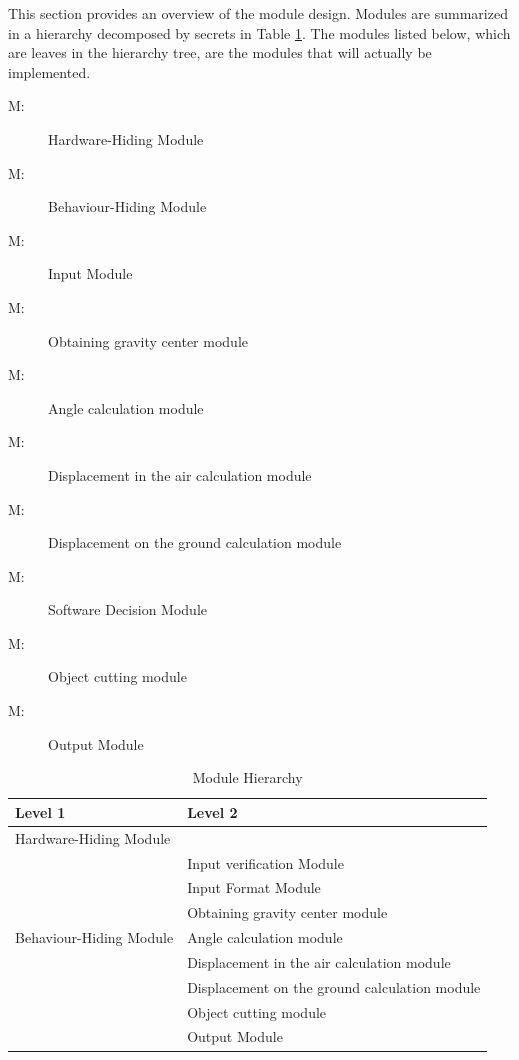 \documentclass[12pt, titlepage]{article}
\newcounter{mnum}
\newcommand{\mthemnum}{M\themnum}
\begin{document}
	This section provides an overview of the module design. Modules are summarized
	in a hierarchy decomposed by secrets in Table \ref{TblMH}. The modules listed
	below, which are leaves in the hierarchy tree, are the modules that will
	actually be implemented.
	
	\begin{description}
		\item [ \mthemnum \label{mHH}:] Hardware-Hiding Module
		\item [ \mthemnum \label{mBH}:] Behaviour-Hiding Module
		\item [ \mthemnum \label{mIF}:] Input Module
		\item [ \mthemnum \label{mOGC}:] Obtaining gravity center module
		\item [ \mthemnum \label{mAC}:] Angle calculation module
		\item [ \mthemnum \label{mDC1}:] Displacement in the air calculation module
		\item [ \mthemnum \label{mDC2}:] Displacement on the ground calculation module
		\item [ \mthemnum \label{mSD}:] Software Decision Module
		\item [ \mthemnum \label{mOC}:] Object cutting module
		\item [ \mthemnum \label{mOM}:] Output Module
	\end{description}
	
	
	\begin{table}[h!]
		\centering
		\begin{tabular}{p{} p{}}
			\toprule
			\textbf{Level 1} & \textbf{Level 2}\\
			\midrule
			
			{Hardware-Hiding Module} & ~ \\
			\midrule
			
			\multirow{7}{0.3\textwidth}{Behaviour-Hiding Module} & Input verification Module\\
			& Input Format Module\\
			& Obtaining gravity center module\\
			& Angle calculation module\\
			& Displacement in the air calculation module\\
			& Displacement on the ground calculation module\\
			\midrule
			
			\multirow{3}{0.3\textwidth}{Software Decision Module} & Object cutting module\\
			& Output Module\\
			\bottomrule
			
		\end{tabular}
		\caption{Module Hierarchy}
		\label{TblMH}
	\end{table}
	
\end{document}
